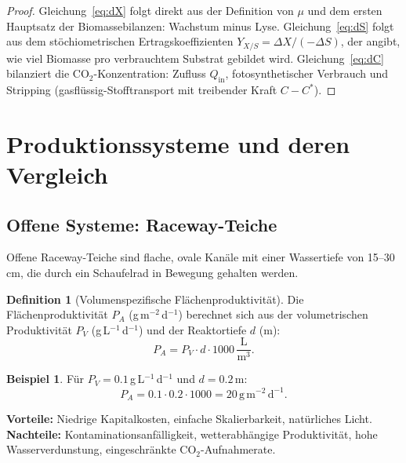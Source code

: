 ﻿\documentclass[a4paper,12pt]{article}
\theoremstyle{definition}
\newtheorem{definition}{Definition}
\newtheorem{beispiel}{Beispiel}
\begin{document}
\begin{proof}
	Gleichung~\eqref{eq:dX} folgt direkt aus der Definition von $\mu$ und dem
	ersten Hauptsatz der Biomassebilanzen: Wachstum minus Lyse.
	Gleichung~\eqref{eq:dS} folgt aus dem stöchiometrischen Ertragskoeffizienten
	$Y_{X/S} = \Delta X / (-\Delta S)$, der angibt, wie viel Biomasse pro
	verbrauchtem Substrat gebildet wird.
	Gleichung~\eqref{eq:dC} bilanziert die $\mathrm{CO}_2$-Konzentration:
	Zufluss $Q_\mathrm{in}$, fotosynthetischer Verbrauch und
	Stripping (gasflüssig-Stofftransport mit treibender Kraft $C - C^*$). \qedhere
\end{proof}

\section{Produktionssysteme und deren Vergleich}

\subsection{Offene Systeme: Raceway-Teiche}

Offene Raceway-Teiche sind flache, ovale Kanäle mit einer Wassertiefe von
15--30\,cm, die durch ein Schaufelrad in Bewegung gehalten werden.

\begin{definition}[Volumenspezifische Flächenproduktivität]
	Die Flächenproduktivität $P_A$ (g\,m$^{-2}$\,d$^{-1}$) berechnet sich aus der
	volumetrischen Produktivität $P_V$ (g\,L$^{-1}$\,d$^{-1}$) und der
	Reaktortiefe $d$ (m):
	\[
		P_A = P_V \cdot d \cdot 1000\,\frac{\mathrm{L}}{\mathrm{m}^3}.
	\]
\end{definition}

\begin{beispiel}
	Für $P_V = 0.1$\,g\,L$^{-1}$\,d$^{-1}$ und $d = 0.2$\,m:
	\[
		P_A = 0.1 \cdot 0.2 \cdot 1000 = 20\,\mathrm{g}\,\mathrm{m}^{-2}\,\mathrm{d}^{-1}.
	\]
\end{beispiel}

\textbf{Vorteile:} Niedrige Kapitalkosten, einfache Skalierbarkeit, natürliches Licht.\\
\textbf{Nachteile:} Kontaminationsanfälligkeit, wetterabhängige Produktivität,
hohe Wasserverdunstung, eingeschränkte CO$_2$-Aufnahmerate.
\end{document}
